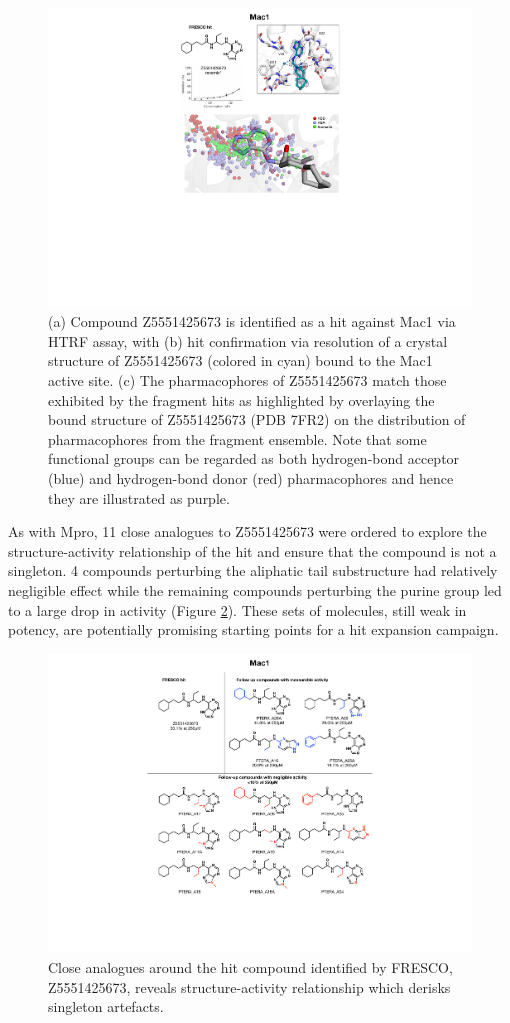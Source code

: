 \begin{figure}[!b]
    \centering
    \includegraphics[width=0.75\linewidth]{Chapters/Fresco/Figs/mac1_fig.pdf}
    \caption{(a) Compound Z5551425673 is identified as a hit against Mac1 via HTRF assay, with (b) hit confirmation via resolution of a crystal structure of Z5551425673 (colored in cyan) bound to the Mac1 active site. (c) The pharmacophores of Z5551425673 match those exhibited by the fragment hits as highlighted by overlaying the bound structure of Z5551425673 (PDB 7FR2) on the distribution of pharmacophores from the fragment ensemble. Note that some functional groups can be regarded as both hydrogen-bond acceptor (blue) and hydrogen-bond donor (red) pharmacophores and hence they are illustrated as purple.}
    \label{fig:mac1_hit}
\end{figure}

As with Mpro, 11 close analogues to Z5551425673 were ordered to explore the structure-activity relationship of the hit and ensure that the compound is not a singleton. 4 compounds perturbing the aliphatic tail substructure had relatively negligible effect while the remaining compounds perturbing the purine group led to a large drop in activity (Figure \ref{fig:mac1_rounds}). These sets of molecules, still weak in potency, are potentially promising starting points for a hit expansion campaign. 

\begin{figure}
    \centering
    \includegraphics[width=0.75\linewidth]{Chapters/Fresco/Figs/mac1_rounds.pdf}
    \caption{Close analogues around the hit compound identified by FRESCO, Z5551425673, reveals structure-activity relationship which derisks singleton artefacts.}
    \label{fig:mac1_rounds}
\end{figure}


